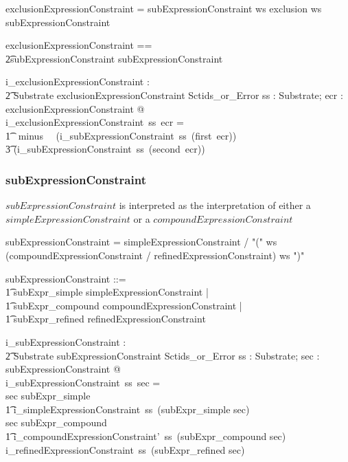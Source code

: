 \documentclass{article}
\def\bnf#1{{\scriptsize {{#1}} }}
\begin{document}
\begin{framed}
\noindent
\bnf{exclusionExpressionConstraint = subExpressionConstraint ws exclusion ws subExpressionConstraint}
\end{framed}

\begin{zed}
exclusionExpressionConstraint == \\ 
\t2subExpressionConstraint \cross subExpressionConstraint
\end{zed}

\begin{gendef}
    i\_exclusionExpressionConstraint : \\
\t2 Substrate \fun exclusionExpressionConstraint \fun Sctids\_or\_Error
\where
   \forall ss : Substrate; ecr : exclusionExpressionConstraint @ \\
i\_exclusionExpressionConstraint~ss~ecr = \\
\t1~ minus~~ (i\_subExpressionConstraint~ss~(first~ecr)) \\
\t3 (i\_subExpressionConstraint~ss~(second~ecr))
\end{gendef}

\subsubsection{subExpressionConstraint}
$subExpressionConstraint$ is interpreted as the interpretation of either a $simpleExpressionConstraint$
or a $compoundExpressionConstraint$
\begin{framed}
\noindent
\bnf{subExpressionConstraint = simpleExpressionConstraint / "(" ws (compoundExpressionConstraint / refinedExpressionConstraint)  ws ")"}
\end{framed}

\begin{zed}
subExpressionConstraint ::= \\
\t1 subExpr\_simple \ldata simpleExpressionConstraint \rdata | \\
\t1 subExpr\_compound \ldata compoundExpressionConstraint \rdata | \\
\t1 subExpr\_refined \ldata refinedExpressionConstraint \rdata
\end{zed}

\begin{gendef}
   i\_subExpressionConstraint : \\
\t2 Substrate \fun subExpressionConstraint \fun Sctids\_or\_Error
\where
   \forall ss : Substrate; sec : subExpressionConstraint @ \\
i\_subExpressionConstraint~ss~sec = \\
   \IF sec \in \ran subExpr\_simple \\
\t1 \THEN i\_simpleExpressionConstraint~ss~(subExpr\_simple \inv sec) \\
    \ELSE \IF sec \in \ran subExpr\_compound \\
\t1 \THEN i\_compoundExpressionConstraint'~ss~(subExpr\_compound \inv sec) \\
    \ELSE i\_refinedExpressionConstraint~ss~(subExpr\_refined \inv sec) 
\end{gendef}
\end{document}
